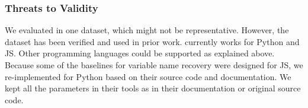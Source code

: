 \vspace{-5pt}
\subsubsection{Threats to Validity}
\label{sec:threats}

We evaluated in one dataset, which might not be
representative. However, the dataset has been verified and used in
prior work.
{\tool} currently works for Python and JS.
Other programming languages could be supported as explained above.
%
Because some of the baselines for variable name recovery were designed
for JS, we re-implemented for Python based on their source
code and documentation.
We kept all the parameters in their tools as in their documentation or
original source code.


